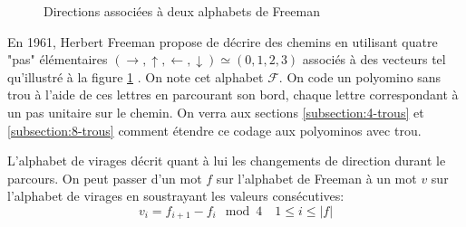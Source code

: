 \begin{figure}
\centering
\begin{subfigure}[b]{.25\textwidth}
\centering
{}
\end{subfigure}
\centering
\begin{subfigure}[b]{.25\textwidth}
\end{subfigure}
\caption{Directions associées à deux alphabets de Freeman}\label{fig:alphabet-freeman}
\end{figure}


En 1961, Herbert Freeman propose de décrire des chemins en utilisant quatre "pas" élémentaires $(\rightarrow,\uparrow,\leftarrow,\downarrow)\simeq (0,1,2,3)$ associés à des vecteurs tel qu'illustré à la figure \ref{fig:alphabet-freeman} \cite{freeman1}. On note cet alphabet $\mathcal{F}$. On code un polyomino sans trou à l'aide de ces lettres en parcourant son bord, chaque lettre correspondant à un pas unitaire sur le chemin. On verra aux sections \ref{subsection:4-trous} et \ref{subsection:8-trous} comment étendre ce codage aux polyominos avec trou.

L'alphabet de virages décrit quant à lui les changements de direction durant le parcours. On peut passer d'un mot $f$ sur l'alphabet de Freeman à un mot $v$ sur l'alphabet de virages en soustrayant les valeurs consécutives:
\[
v_i = f_{i+1} - f_{i} \mod 4 \quad 1 \leq i \le |f|
\]

